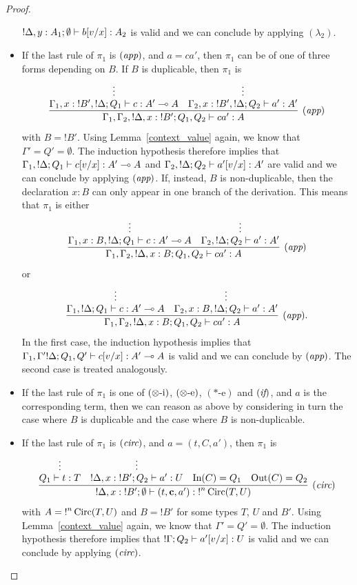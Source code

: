 \documentclass[twoside]{article}
\begin{document}
\begin{proof}
\begin{itemize}
 ${!}\Delta,y:A_1;\emptyset \vdash b[v/x]:A_2$ is valid and we can conclude
 by applying $(\lambda_2)$.
 \item If the last rule of $\pi_1$ is $(\textit{app})$, and $a=ca'$, then $\pi_1$ can 
 be of one of three forms depending on $B$. If $B$ is duplicable, then $\pi_1$ is
 \[
 \infer[(\rul{app})]{\Gamma_1,\Gamma_2,{!}\Delta,x:{!}B';Q_1,Q_2\entails ca':A}{
    \deduce[]{\Gamma_1, x:{!}B',{!}\Delta;Q_1\entails c:A'\loli A}{
      \vdots
    }
    &
    \deduce[]{\Gamma_2, x:{!}B',{!}\Delta ;Q_2\entails a':A' }{
      \vdots
    }
 }
 \]
 with $B={!}B'$. Using 
 Lemma~\hyperref[context_value]{\ref*{context_value}} again, we 
 know that $\Gamma'=Q'=\emptyset$. The induction hypothesis therefore 
 implies that $\Gamma_1,{!}\Delta;Q_1\vdash c[v/x]:A'\multimap A$ and 
 $\Gamma_2,{!}\Delta ;Q_2\vdash a'[v/x]:A'$ are valid and we can conclude 
 by applying $(\textit{app})$. If, instead, $B$ is non-duplicable, then the declaration 
 $x:B$ can only appear in one branch of the derivation. This means that $\pi_1$ 
 is either 
  \[
 \infer[(\rul{app})]{\Gamma_1,\Gamma_2,{!}\Delta,x:B;Q_1,Q_2\entails ca':A}{
    \deduce[]{\Gamma_1, x:B,{!}\Delta;Q_1\entails c:A'\loli A}{
      \vdots
    }
    &
    \deduce[]{\Gamma_2, {!}\Delta ;Q_2\entails a':A'}{
      \vdots
    }     
 }
 \]
 or
  \[
 \infer[(\rul{app}).]{\Gamma_1,\Gamma_2,{!}\Delta,x:B;Q_1,Q_2\entails ca':A}{
    \deduce[]{\Gamma_1, {!}\Delta;Q_1\entails c:A'\loli A}{ 
      \vdots
    }
    &
    \deduce[]{\Gamma_2, x:B,{!}\Delta ;Q_2\entails a':A'}{
      \vdots
    }     
 }
 \]
 In the first case, the induction hypothesis implies that 
 $\Gamma_1,\Gamma' {!}\Delta;Q_1,Q'\vdash c[v/x]:A'\multimap A$ is valid and 
 we can conclude by $(\textit{app})$. The second case is treated analogously.
 \item If the last rule of $\pi_1$ is one of $(\otimes\mbox{-i})$, $(\otimes\mbox{-e})$,
 $(*\mbox{-e})$ and $(\textit{if})$, and $a$ is the corresponding term, then 
 we can reason as above by considering in turn the case where $B$ is 
 duplicable and the case where $B$ is non-duplicable.
 \item If the last rule of $\pi_1$ is $(\textit{circ})$, and $a=(t,C,a')$, then 
 $\pi_1$ is
 \[
 \infer[(\rul{circ})]{{!}\Delta,x:{!}B';\emptyset \entails (t,\mathbf{c},a'):{!}^n\Circ(T,U)}{
    \deduce[]{Q_1\entails t:T}{
      \vdots
    }    
    &
    \deduce[]{{!}\Delta,x:{!}B' ; Q_2\entails a':U}{
      \vdots
    }     
    &
    \In(C)=Q_1 
    &
    \Out(C)=Q_2
 }
 \]
 with $A={!}^n\mathop{\textrm{Circ}}\nolimits(T,U)$ and $B={!}B'$ for some types $T$, $U$ and $B'$. Using  
 Lemma~\hyperref[context_value]{\ref*{context_value}} again, we know 
 that $\Gamma'=Q'=\emptyset$. The induction hypothesis therefore implies that
 ${!}\Gamma; Q_2\vdash a'[v/x]:U$ is valid and we can conclude
 by applying $(\textit{circ})$.
\end{itemize}
\end{proof}
\end{document}
